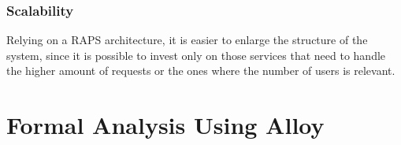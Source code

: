 \documentclass[12pt,a4paper]{article}
\begin{document}
		\subsubsection{Scalability}
		Relying on a RAPS architecture, it is easier to enlarge the structure of the system, since it is possible to invest only on those services that need to handle the higher amount of requests or the ones where the number of users is relevant.
	
	
	\newpage
	\section{Formal Analysis Using Alloy}
	
	\newpage
	
\end{document}
